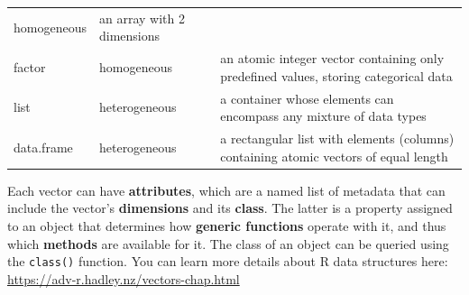 \documentclass[]{book}
\begin{document}
\begin{longtable}[]{@{}lll@{}}
\begin{minipage}[t]{0.10\columnwidth}
homogeneous\strut
\end{minipage} & \begin{minipage}[t]{0.71\columnwidth}\raggedright\strut
an array with 2 dimensions\strut
\end{minipage}\tabularnewline
\begin{minipage}[t]{0.10\columnwidth}\raggedright\strut
factor\strut
\end{minipage} & \begin{minipage}[t]{0.10\columnwidth}\raggedright\strut
homogeneous\strut
\end{minipage} & \begin{minipage}[t]{0.71\columnwidth}\raggedright\strut
an atomic integer vector containing only predefined values, storing
categorical data\strut
\end{minipage}\tabularnewline
\begin{minipage}[t]{0.10\columnwidth}\raggedright\strut
list\strut
\end{minipage} & \begin{minipage}[t]{0.10\columnwidth}\raggedright\strut
heterogeneous\strut
\end{minipage} & \begin{minipage}[t]{0.71\columnwidth}\raggedright\strut
a container whose elements can encompass any mixture of data types\strut
\end{minipage}\tabularnewline
\begin{minipage}[t]{0.10\columnwidth}\raggedright\strut
data.frame\strut
\end{minipage} & \begin{minipage}[t]{0.10\columnwidth}\raggedright\strut
heterogeneous\strut
\end{minipage} & \begin{minipage}[t]{0.71\columnwidth}\raggedright\strut
a rectangular list with elements (columns) containing atomic vectors of
equal length\strut
\end{minipage}\tabularnewline
\bottomrule
\end{longtable}

Each vector can have \textbf{attributes}, which are a named list of
metadata that can include the vector's \textbf{dimensions} and its
\textbf{class}. The latter is a property assigned to an object that
determines how \textbf{generic functions} operate with it, and thus
which \textbf{methods} are available for it. The class of an object can
be queried using the \texttt{class()} function. You can learn more
details about R data structures here:
\url{https://adv-r.hadley.nz/vectors-chap.html}
\end{document}
